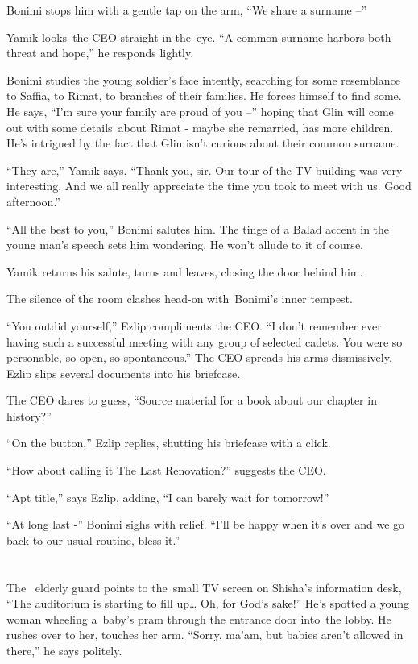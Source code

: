 \documentclass[twoside,11pt]{book}
\begin{document}
Bonimi{ }stops{ }him with a gentle tap on the arm, ``We share a surname
--''

Yamik looks~the CEO straight in the~eye. ``A common surname harbors both threat and hope,'' he
responds lightly.

Bonimi studies the young soldier's face intently, searching for some resemblance to Saffia, to Rimat, to branches of
their families. He forces himself to find some. He says, ``I'm sure your family{ }are proud
of you --'' hoping that Glin will come out with some details~about Rimat - maybe she remarried, has more
children. He's intrigued by the fact that Glin isn't curious about their common surname.

``They are,'' Yamik says. ``Thank you, sir. Our tour of the TV building was very
interesting. And we all really appreciate the time you took to meet with us. Good afternoon.''

``All the best to you,'' Bonimi salutes him. The tinge of a Balad accent in the young man's
speech sets him wondering. He won't allude to it of course.

Yamik returns his salute, turns and leaves, closing the door behind him.

The silence of the room clashes head-on with~Bonimi's inner tempest.

``You outdid yourself,'' Ezlip compliments the CEO. ``I don't remember ever
having such a successful meeting with any group of selected cadets. You were so personable, so open, so
spontaneous.'' The CEO spreads his arms dismissively. Ezlip slips several documents into his
briefcase.\textbf{ }

The CEO dares to guess, ``Source material for a book about our chapter in history?''

``On the button,'' Ezlip replies, shutting his briefcase with a click.

``How about calling it The Last Renovation?'' suggests the CEO.

``Apt title,'' says Ezlip, adding, ``I can barely wait for
tomorrow!''

``At long last -'' Bonimi sighs with relief. ``I'll be happy when it's over and
we go back to our usual routine, bless it.''


\bigskip

\chapter{}

The ~elderly guard points to the~small TV screen on Shisha's information desk, ``The auditorium is starting
to fill up{\dots} Oh, for God's sake!'' He's spotted a young woman wheeling a~baby's pram through the
entrance door into~the lobby. He rushes{ }over to her, touches her arm.
``Sorry, ma'am, but babies aren't allowed in there,'' he says politely.
\end{document}
